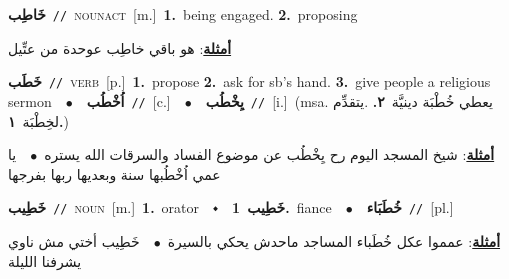 \documentclass[10pt,a4paper,twoside]{article} %
\begin{document}
\begin{multicols}{2}
{\setlength\topsep{0pt}\textbf{\foreignlanguage{arabic}{خَاطِب}}\ {\color{gray}\texttt{//}\color{black}}\ \textsc{noun\textunderscore act}\ [m.]\ \textbf{1.}~being engaged.  \textbf{2.}~proposing\  \begin{flushright}\color{gray}\foreignlanguage{arabic}{\textbf{\underline{\foreignlanguage{arabic}{أمثلة}}}: هو باقي خاطِب عوحدة من عتِّيل}\end{flushright}\color{black}} \vspace{2mm}

{\setlength\topsep{0pt}\textbf{\foreignlanguage{arabic}{خَطَب}}\ {\color{gray}\texttt{//}\color{black}}\ \textsc{verb}\ [p.]\ \textbf{1.}~propose  \textbf{2.}~ask for sb's hand.  \textbf{3.}~give people a religious sermon\ \ $\bullet$\ \ \setlength\topsep{0pt}\textbf{\foreignlanguage{arabic}{اُخْطُب}}\ {\color{gray}\texttt{//}\color{black}}\ [c.]\ \ $\bullet$\ \ \setlength\topsep{0pt}\textbf{\foreignlanguage{arabic}{يِخْطُب}}\ {\color{gray}\texttt{//}\color{black}}\ [i.]\ \color{gray}(msa. \foreignlanguage{arabic}{يعطي خُطْبَة دينيَّة}~\foreignlanguage{arabic}{\textbf{٢.}}  .\foreignlanguage{arabic}{يتقدِّم لخِطْبَة}~\foreignlanguage{arabic}{\textbf{١.}})\color{black}\  \begin{flushright}\color{gray}\foreignlanguage{arabic}{\textbf{\underline{\foreignlanguage{arabic}{أمثلة}}}: شيخ المسجد اليوم رح يِخْطُب عن موضوع الفساد والسرقات الله يستره\ $\bullet$\ \  يا عمي اُخْطُبها سنة وبعديها ربها بفرجها}\end{flushright}\color{black}} \vspace{2mm}

{\setlength\topsep{0pt}\textbf{\foreignlanguage{arabic}{خَطِيب}}\ {\color{gray}\texttt{//}\color{black}}\ \textsc{noun}\ [m.]\ \textbf{1.}~orator\ \ $\smblkdiamond$\ \ \setlength\topsep{0pt}\textbf{\foreignlanguage{arabic}{خَطِيب}}\ \textbf{1.}~fiance\ \ $\bullet$\ \ \setlength\topsep{0pt}\textbf{\foreignlanguage{arabic}{خُطَبَاء}}\ {\color{gray}\texttt{//}\color{black}}\ [pl.]\  \begin{flushright}\color{gray}\foreignlanguage{arabic}{\textbf{\underline{\foreignlanguage{arabic}{أمثلة}}}: عمموا عكل خُطَباء المساجد ماحدش يحكي بالسيرة\ $\bullet$\ \  خَطِيب أختي مش ناوي يشرفنا الليلة}\end{flushright}\color{black}} \vspace{2mm}


\end{multicols}
\end{document}
